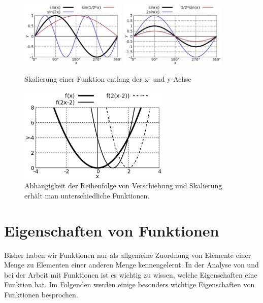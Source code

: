 \begin{figure}
    \centering
    \includegraphics[width=0.45\textwidth]{./gnuplot/transform-fun-scale-x}
    \includegraphics[width=0.45\textwidth]{./gnuplot/transform-fun-scale-y}
    \caption{Skalierung einer Funktion entlang der x- und y-Achse}
    \label{fig:TransformFunScale}
\end{figure}

\begin{figure}
    \centering
    \includegraphics[width=0.65\textwidth]{./gnuplot/transform-translate-scale-order}
    \caption[Verschiebung und Skalierung in unterschiedlicher Reihenfolge]{Abhängigkeit der Reihenfolge von Verschiebung und Skalierung erhält man unterschiedliche Funktionen.}
    \label{fig:TransformOrder}
\end{figure}



\section{Eigenschaften von Funktionen}

Bisher haben wir Funktionen nur als allgemeine Zuordnung von Elemente einer Menge zu Elementen einer anderen Menge kennengelernt. In der Analyse von und bei der Arbeit mit Funktionen ist es wichtig zu wissen, welche Eigenschaften eine Funktion hat. Im Folgenden werden einige besonders wichtige Eigenschaften von Funktionen besprochen.

